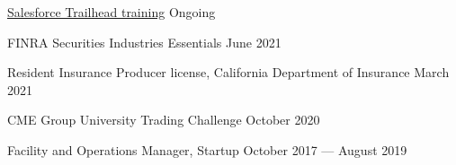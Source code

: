 
 \href{https://trailblazer.me/id/aahern8}{Salesforce Trailhead training} 	\hfill Ongoing

FINRA Securities Industries Essentials	\hfill June 2021

Resident Insurance Producer license, California Department of Insurance	\hfill March 2021

CME Group University Trading Challenge	\hfill October 2020

Facility and Operations Manager, Startup	\hfill October 2017 --- August 2019
